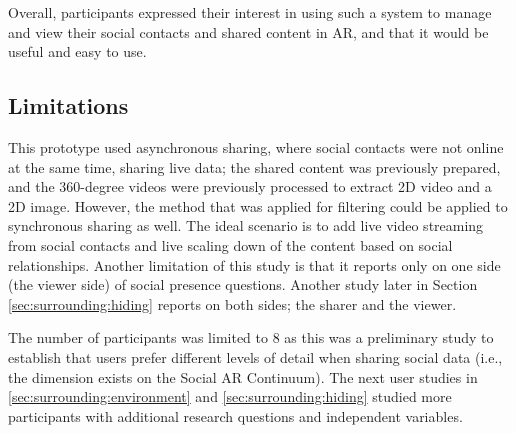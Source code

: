 Overall, participants expressed their interest in using such a system to manage and view their social contacts and shared content in AR, and that it would be useful and easy to use. 

\subsection{Limitations}

This prototype used asynchronous sharing, where social contacts were not online at the same time, sharing live data; the shared content was previously prepared, and the 360-degree videos were previously processed to extract 2D video and a 2D image. However, the method that was applied for filtering could be applied to synchronous sharing as well. The ideal scenario is to add live video streaming from social contacts and live scaling down of the content based on social relationships. Another limitation of this study is that it reports only on one side (the viewer side) of social presence questions. Another study later in Section \ref{sec:surrounding:hiding} reports on both sides; the sharer and the viewer. 

The number of participants was limited to 8 as this was a preliminary study to establish that users prefer different levels of detail when sharing social data (i.e., the dimension exists on the Social AR Continuum). The next user studies in \ref{sec:surrounding:environment} and \ref{sec:surrounding:hiding} studied more participants with additional research questions and independent variables.




